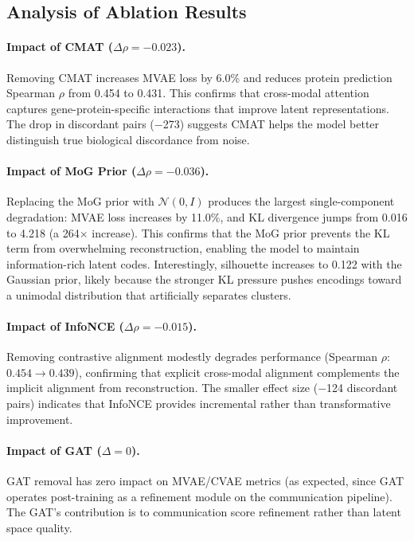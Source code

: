\documentclass[11pt,a4paper]{article}
\begin{document}
\subsection{Analysis of Ablation Results}

\paragraph{Impact of CMAT ($\Delta\rho = -0.023$).}
Removing CMAT increases MVAE loss by 6.0\% and reduces protein prediction Spearman $\rho$ from 0.454 to 0.431.
This confirms that cross-modal attention captures gene-protein-specific interactions that improve latent representations.
The drop in discordant pairs ($-$273) suggests CMAT helps the model better distinguish true biological discordance from noise.

\paragraph{Impact of MoG Prior ($\Delta\rho = -0.036$).}
Replacing the MoG prior with $\mathcal{N}(0,I)$ produces the largest single-component degradation: MVAE loss increases by 11.0\%, and KL divergence jumps from 0.016 to 4.218 (a 264$\times$ increase).
This confirms that the MoG prior prevents the KL term from overwhelming reconstruction, enabling the model to maintain information-rich latent codes.
Interestingly, silhouette increases to 0.122 with the Gaussian prior, likely because the stronger KL pressure pushes encodings toward a unimodal distribution that artificially separates clusters.

\paragraph{Impact of InfoNCE ($\Delta\rho = -0.015$).}
Removing contrastive alignment modestly degrades performance (Spearman $\rho$: $0.454 \to 0.439$), confirming that explicit cross-modal alignment complements the implicit alignment from reconstruction.
The smaller effect size ($-$124 discordant pairs) indicates that InfoNCE provides incremental rather than transformative improvement.

\paragraph{Impact of GAT ($\Delta = 0$).}
GAT removal has zero impact on MVAE/CVAE metrics (as expected, since GAT operates post-training as a refinement module on the communication pipeline).
The GAT's contribution is to communication score refinement rather than latent space quality.
\end{document}
